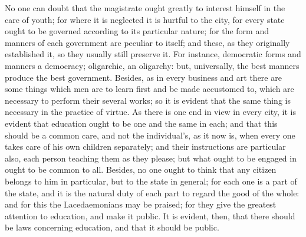 

No one can doubt that the magistrate ought greatly to interest himself in
the care of youth; for where it is neglected it is hurtful to the city,
for every state ought to be governed according to its particular nature;
for the form and manners of each government are peculiar to itself; and
these, as they originally established it, so they usually still preserve
it. For instance, democratic forms and manners a democracy; oligarchic, an
oligarchy: but, universally, the best manners produce the best government.
Besides, as in every business and art there are some things which men are
to learn first and be made accustomed to, which are necessary to perform
their several works; so it is evident that the same thing is necessary in
the practice of virtue. As there is one end in view in every city, it is
evident that education ought to be one and the same in each; and that this
should be a common care, and not the individual's, as it now is, when
every one takes care of his own children separately; and their
instructions are particular also, each person teaching them as they
please; but what ought to be engaged in ought to be common to all.
Besides, no one ought to think that any citizen belongs to him in
particular, but to the state in general; for each one is a part of the
state, and it is the natural duty of each part to regard the good of the
whole: and for this the Lacedaemonians may be praised; for they give the
greatest attention to education, and make it public. It is evident, then,
that there should be laws concerning education, and that it should be
public.


